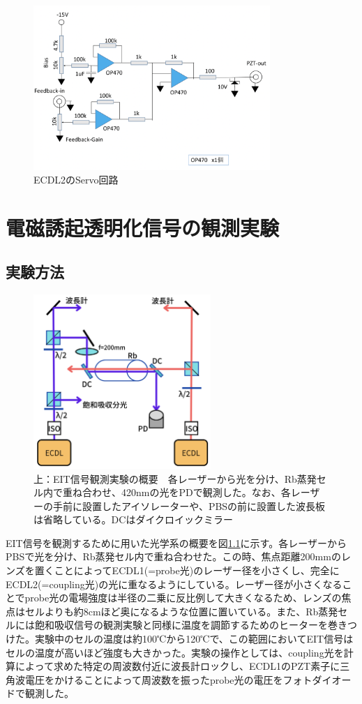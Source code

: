 \documentclass[dvipdfmx]{jsreport}
\begin{document}
\begin{figure}[hbtp]
\centering
\includegraphics[width=0.8\textwidth]{images/wave_servo.png}
\caption{\label{fig:wave-servo}ECDL2のServo回路}
\end{figure}

\clearpage
\chapter{電磁誘起透明化信号の観測実験}
\section{実験方法}
\begin{figure}
\centering
\includegraphics[width=0.6\textwidth]{images/eit.png}
\caption{\label{fig:eit}上：EIT信号観測実験の概要　各レーザーから光を分け、Rb蒸発セル内で重ね合わせ、420nmの光をPDで観測した。なお、各レーザーの手前に設置したアイソレーターや、PBSの前に設置した波長板は省略している。DCはダイクロイックミラー}
\end{figure}
EIT信号を観測するために用いた光学系の概要を図\ref{fig:eit}に示す。各レーザーからPBSで光を分け、Rb蒸発セル内で重ね合わせた。この時、焦点距離200mmのレンズを置くことによってECDL1(=probe光)のレーザー径を小さくし、完全にECDL2(=coupling光)の光に重なるようにしている。レーザー径が小さくなることでprobe光の電場強度は半径の二乗に反比例して大きくなるため、レンズの焦点はセルよりも約8cmほど奥になるような位置に置いている。また、Rb蒸発セルには飽和吸収信号の観測実験と同様に温度を調節するためのヒーターを巻きつけた。実験中のセルの温度は約100℃から120℃で、この範囲においてEIT信号はセルの温度が高いほど強度も大きかった。実験の操作としては、coupling光を計算によって求めた特定の周波数付近に波長計ロックし、ECDL1のPZT素子に三角波電圧をかけることによって周波数を振ったprobe光の電圧をフォトダイオードで観測した。
\end{document}
